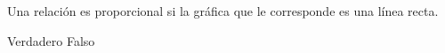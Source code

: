 Una relación es proporcional si la gráfica que le corresponde es una línea recta.

\begin{oneparchoices}
    \CorrectChoice Verdadero
    \choice Falso
\end{oneparchoices}